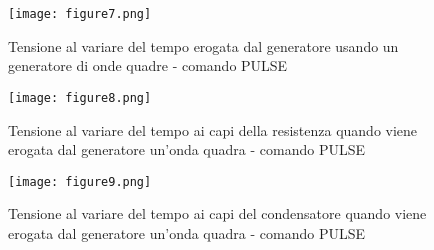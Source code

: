 \documentclass{article}
\begin{document}
\begin{figure}
    \centering
    \texttt{[image: figure7.png]}
    \caption{Tensione al variare del tempo erogata dal generatore usando un generatore di onde quadre - comando PULSE}
    \label{figura7}
\end{figure}
\begin{figure}
    \centering
    \texttt{[image: figure8.png]}
    \caption{Tensione al variare del tempo ai capi della resistenza quando viene
erogata dal generatore un’onda quadra - comando PULSE}
    \label{figura8}
\end{figure}
\begin{figure}
    \centering
    \texttt{[image: figure9.png]}
    \caption{Tensione al variare del tempo ai capi del condensatore quando viene
erogata dal generatore un’onda quadra - comando PULSE}
    \label{figura9}
\end{figure}
\end{document}
